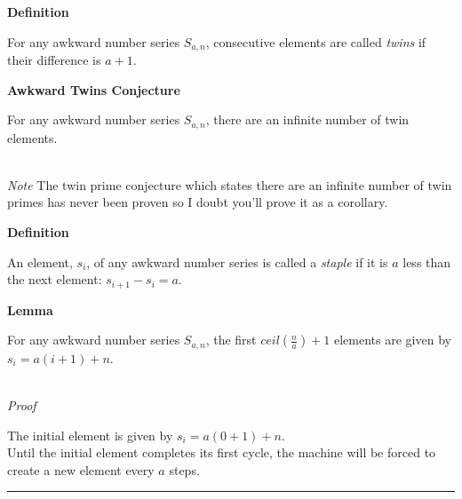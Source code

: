\documentclass[a4paper,12pt]{article}
\begin{document}
\label{definition:twin_awkward_numbers}
\hypertarget{definition:twin_awkward_numbers}{}
\begin{tcolorbox}
\textbf{Definition}

For any awkward number series $S_{a,n}$, consecutive elements are called \textit{twins} if their difference is $a + 1$.
\end{tcolorbox}





\label{conjecture:infinite_twins}
\hypertarget{conjecture:infinite_twins}{}
\begin{tcolorbox}
\textbf{Awkward Twins Conjecture}

For any awkward number series $S_{a,n}$, there are an infinite number of twin elements.
\end{tcolorbox}

\noindent \\
\textit{Note}
The twin prime conjecture which states there are an infinite number of twin primes has never been proven so I doubt you'll prove it as a corollary.




\label{definition:staple_awkward_number}
\hypertarget{definition:staple_awkward_number}{}
\begin{tcolorbox}
\textbf{Definition}

An element, $s_i$, of any awkward number series is called a \textit{staple} if it is $a$ less than the next element: $s_{i+1} - s_i = a$.
\end{tcolorbox}








\label{lemma:initial_staples}
\hypertarget{lemma:initial_staples}{}
\begin{tcolorbox}
\textbf{Lemma}

For any awkward number series $S_{a,n}$, the first $ceil(\frac{n}{a}) + 1$ elements are given by $s_i = a(i + 1) + n$.
\end{tcolorbox}

\noindent \\
\textit{Proof}

\noindent The initial element is given by $s_i = a(0 + 1) + n$.\\

\noindent Until the initial element completes its first cycle, the machine will be forced to create a new element every $a$ steps.

\begin{center}
\noindent\rule{8cm}{0.4pt}
\end{center}
\end{document}
